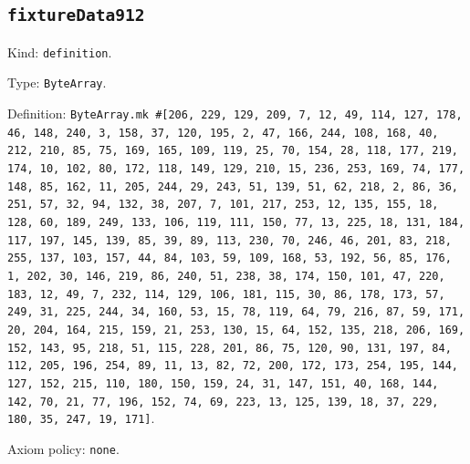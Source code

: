 \documentclass[11pt]{article}
\begin{document}
\subsection*{\texttt{fixtureData912}}
\noindent Kind: \texttt{definition}.\par
\noindent Type: \texttt{ByteArray}.\par
\noindent Definition: \texttt{ByteArray.mk \#[206, 229, 129, 209, 7, 12, 49, 114, 127, 178, 46, 148, 240, 3, 158, 37, 120, 195, 2, 47, 166, 244, 108, 168, 40, 212, 210, 85, 75, 169, 165, 109, 119, 25, 70, 154, 28, 118, 177, 219, 174, 10, 102, 80, 172, 118, 149, 129, 210, 15, 236, 253, 169, 74, 177, 148, 85, 162, 11, 205, 244, 29, 243, 51, 139, 51, 62, 218, 2, 86, 36, 251, 57, 32, 94, 132, 38, 207, 7, 101, 217, 253, 12, 135, 155, 18, 128, 60, 189, 249, 133, 106, 119, 111, 150, 77, 13, 225, 18, 131, 184, 117, 197, 145, 139, 85, 39, 89, 113, 230, 70, 246, 46, 201, 83, 218, 255, 137, 103, 157, 44, 84, 103, 59, 109, 168, 53, 192, 56, 85, 176, 1, 202, 30, 146, 219, 86, 240, 51, 238, 38, 174, 150, 101, 47, 220, 183, 12, 49, 7, 232, 114, 129, 106, 181, 115, 30, 86, 178, 173, 57, 249, 31, 225, 244, 34, 160, 53, 15, 78, 119, 64, 79, 216, 87, 59, 171, 20, 204, 164, 215, 159, 21, 253, 130, 15, 64, 152, 135, 218, 206, 169, 152, 143, 95, 218, 51, 115, 228, 201, 86, 75, 120, 90, 131, 197, 84, 112, 205, 196, 254, 89, 11, 13, 82, 72, 200, 172, 173, 254, 195, 144, 127, 152, 215, 110, 180, 150, 159, 24, 31, 147, 151, 40, 168, 144, 142, 70, 21, 77, 196, 152, 74, 69, 223, 13, 125, 139, 18, 37, 229, 180, 35, 247, 19, 171]}.\par
\noindent Axiom policy: \texttt{none}.\par
\end{document}
